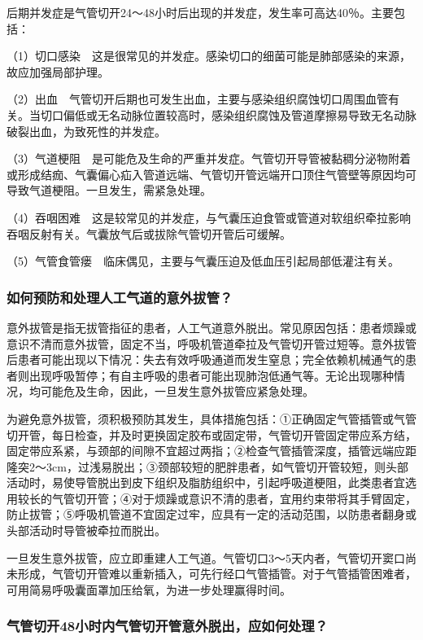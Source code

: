 后期并发症是气管切开24～48小时后出现的并发症，发生率可高达40％。主要包括：

（1）切口感染　这是很常见的并发症。感染切口的细菌可能是肺部感染的来源，故应加强局部护理。

（2）出血　气管切开后期也可发生出血，主要与感染组织腐蚀切口周围血管有关。当切口偏低或无名动脉位置较高时，感染组织腐蚀及管道摩擦易导致无名动脉破裂出血，为致死性的并发症。

（3）气道梗阻　是可能危及生命的严重并发症。气管切开导管被黏稠分泌物附着或形成结痂、气囊偏心疝入管道远端、气管切开管远端开口顶住气管壁等原因均可导致气道梗阻。一旦发生，需紧急处理。

（4）吞咽困难　这是较常见的并发症，与气囊压迫食管或管道对软组织牵拉影响吞咽反射有关。气囊放气后或拔除气管切开管后可缓解。

（5）气管食管瘘　临床偶见，主要与气囊压迫及低血压引起局部低灌注有关。

\subsubsection{如何预防和处理人工气道的意外拔管？}

意外拔管是指无拔管指征的患者，人工气道意外脱出。常见原因包括：患者烦躁或意识不清而意外拔管，固定不当，呼吸机管道牵拉及气管切开管过短等。意外拔管后患者可能出现以下情况：失去有效呼吸通道而发生窒息；完全依赖机械通气的患者则出现呼吸暂停；有自主呼吸的患者可能出现肺泡低通气等。无论出现哪种情况，均可能危及生命，因此，一旦发生意外拔管应紧急处理。

为避免意外拔管，须积极预防其发生，具体措施包括：①正确固定气管插管或气管切开管，每日检查，并及时更换固定胶布或固定带，气管切开管固定带应系方结，固定带应系紧，与颈部的间隙不宜超过两指；②检查气管插管深度，插管远端应距隆突2～3cm，过浅易脱出；③颈部较短的肥胖患者，如气管切开管较短，则头部活动时，易使导管脱出到皮下组织及脂肪组织中，引起呼吸道梗阻，此类患者宜选用较长的气管切开管；④对于烦躁或意识不清的患者，宜用约束带将其手臂固定，防止拔管；⑤呼吸机管道不宜固定过牢，应具有一定的活动范围，以防患者翻身或头部活动时导管被牵拉而脱出。

一旦发生意外拔管，应立即重建人工气道。气管切口3～5天内者，气管切开窦口尚未形成，气管切开管难以重新插入，可先行经口气管插管。对于气管插管困难者，可用简易呼吸囊面罩加压给氧，为进一步处理赢得时间。

\subsubsection{气管切开48小时内气管切开管意外脱出，应如何处理？}

